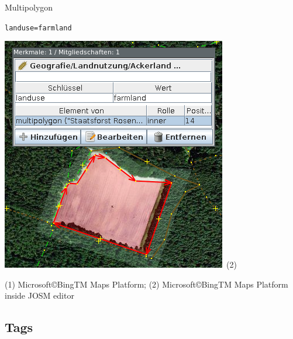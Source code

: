 \documentclass{beamer}
\begin{document}
\begin{frame}{Multipolygon}
\begin{center}
\begin{minipage}[b][0.6\textheight][c]{0.4\linewidth}
			\end{minipage}
			\begin{minipage}[b][0.6\textheight][c]{0.3\linewidth}
				\texttt{landuse=farmland}
				\begin{center}
					\includegraphics[width=\linewidth,height=\textheight,keepaspectratio]{images/multipolygon_josm.png}~\tiny{(2)}
				\end{center}
			\end{minipage}
		\end{center}
		{\tiny (1) Microsoft\copyright BingTM Maps Platform; (2) Microsoft\copyright BingTM Maps Platform inside JOSM editor}
	\end{frame}

	\subsection{Tags}
	
\end{document}
